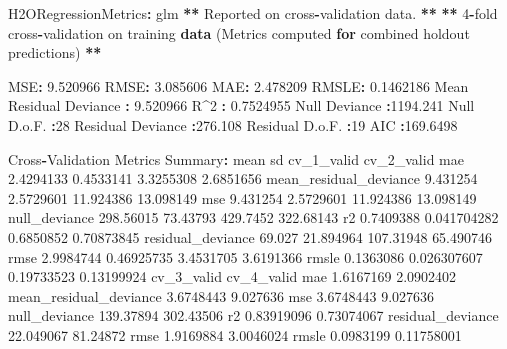 \documentclass[
]{book}
\newenvironment{Shaded}{\begin{snugshade}}{\end{snugshade}}
\newcommand{\ControlFlowTok}[1]{\textcolor[rgb]{0.13,0.29,0.53}{\textbf{#1}}}
\newcommand{\DecValTok}[1]{\textcolor[rgb]{0.00,0.00,0.81}{#1}}
\newcommand{\ErrorTok}[1]{\textcolor[rgb]{0.64,0.00,0.00}{\textbf{#1}}}
\newcommand{\FloatTok}[1]{\textcolor[rgb]{0.00,0.00,0.81}{#1}}
\newcommand{\KeywordTok}[1]{\textcolor[rgb]{0.13,0.29,0.53}{\textbf{#1}}}
\newcommand{\NormalTok}[1]{#1}
\newcommand{\OperatorTok}[1]{\textcolor[rgb]{0.81,0.36,0.00}{\textbf{#1}}}
\newcommand{\StringTok}[1]{\textcolor[rgb]{0.31,0.60,0.02}{#1}}
\begin{document}
\begin{Shaded}
\begin{Highlighting}[]
{\NormalTok{H2ORegressionMetrics}\OperatorTok{:}\StringTok{ }\NormalTok{glm}
\OperatorTok{**}\StringTok{ }\NormalTok{Reported on cross}\OperatorTok{-}\NormalTok{validation data. }\OperatorTok{**}
\ErrorTok{**}\StringTok{ }\DecValTok{4}\OperatorTok{-}\NormalTok{fold cross}\OperatorTok{-}\NormalTok{validation on training }\KeywordTok{data}\NormalTok{ (Metrics computed }\ControlFlowTok{for}\NormalTok{ combined holdout predictions) }\OperatorTok{**}

\NormalTok{MSE}\OperatorTok{:}\StringTok{  }\FloatTok{9.520966}
\NormalTok{RMSE}\OperatorTok{:}\StringTok{  }\FloatTok{3.085606}
\NormalTok{MAE}\OperatorTok{:}\StringTok{  }\FloatTok{2.478209}
\NormalTok{RMSLE}\OperatorTok{:}\StringTok{  }\FloatTok{0.1462186}
\NormalTok{Mean Residual Deviance }\OperatorTok{:}\StringTok{  }\FloatTok{9.520966}
\NormalTok{R}\OperatorTok{^}\DecValTok{2} \OperatorTok{:}\StringTok{  }\FloatTok{0.7524955}
\NormalTok{Null Deviance }\OperatorTok{:}\FloatTok{1194.241}
\NormalTok{Null D.o.F. }\OperatorTok{:}\DecValTok{28}
\NormalTok{Residual Deviance }\OperatorTok{:}\FloatTok{276.108}
\NormalTok{Residual D.o.F. }\OperatorTok{:}\DecValTok{19}
\NormalTok{AIC }\OperatorTok{:}\FloatTok{169.6498}


\NormalTok{Cross}\OperatorTok{-}\NormalTok{Validation Metrics Summary}\OperatorTok{:}\StringTok{ }
\StringTok{                            }\NormalTok{mean          sd cv_}\DecValTok{1}\NormalTok{_valid cv_}\DecValTok{2}\NormalTok{_valid}
\NormalTok{mae                    }\FloatTok{2.4294133}   \FloatTok{0.4533141}  \FloatTok{3.3255308}  \FloatTok{2.6851656}
\NormalTok{mean_residual_deviance  }\FloatTok{9.431254}   \FloatTok{2.5729601}  \FloatTok{11.924386}  \FloatTok{13.098149}
\NormalTok{mse                     }\FloatTok{9.431254}   \FloatTok{2.5729601}  \FloatTok{11.924386}  \FloatTok{13.098149}
\NormalTok{null_deviance          }\FloatTok{298.56015}    \FloatTok{73.43793}   \FloatTok{429.7452}  \FloatTok{322.68143}
\NormalTok{r2                     }\FloatTok{0.7409388} \FloatTok{0.041704282}  \FloatTok{0.6850852} \FloatTok{0.70873845}
\NormalTok{residual_deviance         }\FloatTok{69.027}   \FloatTok{21.894964}  \FloatTok{107.31948}  \FloatTok{65.490746}
\NormalTok{rmse                   }\FloatTok{2.9984744}  \FloatTok{0.46925735}  \FloatTok{3.4531705}  \FloatTok{3.6191366}
\NormalTok{rmsle                  }\FloatTok{0.1363086} \FloatTok{0.026307607} \FloatTok{0.19733523} \FloatTok{0.13199924}
\NormalTok{                       cv_}\DecValTok{3}\NormalTok{_valid cv_}\DecValTok{4}\NormalTok{_valid}
\NormalTok{mae                     }\FloatTok{1.6167169}  \FloatTok{2.0902402}
\NormalTok{mean_residual_deviance  }\FloatTok{3.6748443}   \FloatTok{9.027636}
\NormalTok{mse                     }\FloatTok{3.6748443}   \FloatTok{9.027636}
\NormalTok{null_deviance           }\FloatTok{139.37894}  \FloatTok{302.43506}
\NormalTok{r2                     }\FloatTok{0.83919096} \FloatTok{0.73074067}
\NormalTok{residual_deviance       }\FloatTok{22.049067}   \FloatTok{81.24872}
\NormalTok{rmse                    }\FloatTok{1.9169884}  \FloatTok{3.0046024}
\NormalTok{rmsle                   }\FloatTok{0.0983199} \FloatTok{0.11758001}

}
\end{Highlighting}
\end{Shaded}
\end{document}
